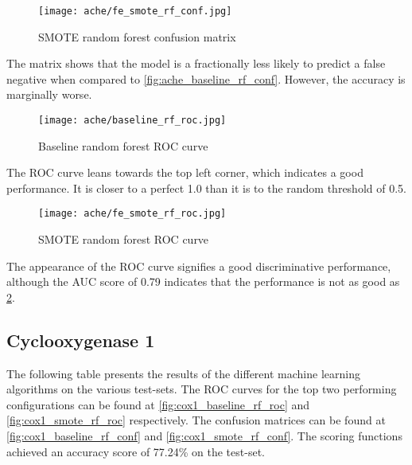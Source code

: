 \begin{figure}[H]
    \begin{center}
        \caption[]{SMOTE random forest confusion matrix}
        \label{fig:ache_smote_rf_conf}
        \texttt{[image: ache/fe\_smote\_rf\_conf.jpg]}
    \end{center}
\end{figure}
The matrix shows that the model is a fractionally less likely to predict a false negative when compared to \ref*{fig:ache_baseline_rf_conf}. However, the accuracy is marginally worse.  

\begin{figure}[H]
    \begin{center}
        \caption[]{Baseline random forest ROC curve}
        \label{fig:ache_baseline_rf_roc}
        \texttt{[image: ache/baseline\_rf\_roc.jpg]}
    \end{center}
\end{figure}
The ROC curve leans towards the top left corner, which indicates a good performance. It is closer to a perfect 1.0 than it is to the random threshold of 0.5.

\begin{figure}[H]
    \begin{center}
        \caption[]{SMOTE random forest ROC curve}
        \label{fig:ache_smote_rf_roc}
        \texttt{[image: ache/fe\_smote\_rf\_roc.jpg]}
    \end{center}
\end{figure}
The appearance of the ROC curve signifies a good discriminative performance, although the AUC score of 0.79 indicates that the performance is not as good as \ref*{fig:ache_baseline_rf_roc}.

\subsection{Cyclooxygenase 1}
The following table presents the results of the different machine learning algorithms on the various
test-sets. The ROC curves for the top two performing configurations can be found at \ref{fig:cox1_baseline_rf_roc} and \ref{fig:cox1_smote_rf_roc}
respectively. The confusion matrices can be found at \ref{fig:cox1_baseline_rf_conf} and \ref{fig:cox1_smote_rf_conf}.
The scoring functions achieved an accuracy score of 77.24\% on the test-set.

